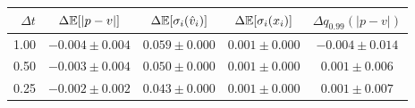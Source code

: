 \begin{tabular}{rcccc}
\hline
$\Delta t$ & $\Delta\mathbb{E}[|p-v|]$ & $\Delta\mathbb{E}[\sigma_i(\hat v_i)]$ & $\Delta\mathbb{E}[\sigma_i(x_i)]$ & $\Delta q_{0.99}(|p-v|)$ \\
\hline
1.00 & $-0.004\pm0.004$ & $0.059\pm0.000$ & $0.001\pm0.000$ & $-0.004\pm0.014$ \\
0.50 & $-0.003\pm0.004$ & $0.050\pm0.000$ & $0.001\pm0.000$ & $0.001\pm0.006$ \\
0.25 & $-0.002\pm0.002$ & $0.043\pm0.000$ & $0.001\pm0.000$ & $0.001\pm0.007$ \\
\hline
\end{tabular}
